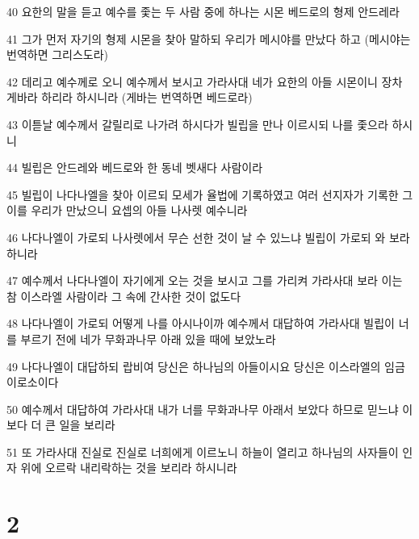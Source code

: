 \par 40 요한의 말을 듣고 예수를 좇는 두 사람 중에 하나는 시몬 베드로의 형제 안드레라
\par 41 그가 먼저 자기의 형제 시몬을 찾아 말하되 우리가 메시야를 만났다 하고 (메시야는 번역하면 그리스도라)
\par 42 데리고 예수께로 오니 예수께서 보시고 가라사대 네가 요한의 아들 시몬이니 장차 게바라 하리라 하시니라 (게바는 번역하면 베드로라)
\par 43 이튿날 예수께서 갈릴리로 나가려 하시다가 빌립을 만나 이르시되 나를 좇으라 하시니
\par 44 빌립은 안드레와 베드로와 한 동네 벳새다 사람이라
\par 45 빌립이 나다나엘을 찾아 이르되 모세가 율법에 기록하였고 여러 선지자가 기록한 그이를 우리가 만났으니 요셉의 아들 나사렛 예수니라
\par 46 나다나엘이 가로되 나사렛에서 무슨 선한 것이 날 수 있느냐 빌립이 가로되 와 보라 하니라
\par 47 예수께서 나다나엘이 자기에게 오는 것을 보시고 그를 가리켜 가라사대 보라 이는 참 이스라엘 사람이라 그 속에 간사한 것이 없도다
\par 48 나다나엘이 가로되 어떻게 나를 아시나이까 예수께서 대답하여 가라사대 빌립이 너를 부르기 전에 네가 무화과나무 아래 있을 때에 보았노라
\par 49 나다나엘이 대답하되 랍비여 당신은 하나님의 아들이시요 당신은 이스라엘의 임금이로소이다
\par 50 예수께서 대답하여 가라사대 내가 너를 무화과나무 아래서 보았다 하므로 믿느냐 이보다 더 큰 일을 보리라
\par 51 또 가라사대 진실로 진실로 너희에게 이르노니 하늘이 열리고 하나님의 사자들이 인자 위에 오르락 내리락하는 것을 보리라 하시니라

\chapter{2}

